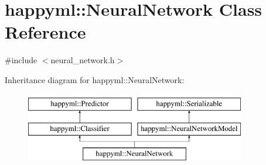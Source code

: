 \hypertarget{classhappyml_1_1NeuralNetwork}{}\section{happyml\+:\+:Neural\+Network Class Reference}
\label{classhappyml_1_1NeuralNetwork}


{\ttfamily \#include $<$neural\+\_\+network.\+h$>$}

Inheritance diagram for happyml\+:\+:Neural\+Network\+:\begin{figure}[H]
\begin{center}
\leavevmode
\includegraphics[height=3.000000cm]{classhappyml_1_1NeuralNetwork}
\end{center}
\end{figure}
